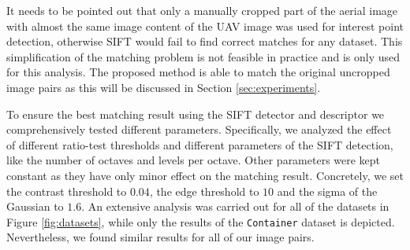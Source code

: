 It needs to be pointed out that only a manually cropped part of the aerial image with almost the same image content of the UAV image was used for interest point detection, otherwise SIFT would fail to find correct matches for any dataset.
This simplification of the matching problem is not feasible in practice and is only used for this analysis.
The proposed method is able to match the original uncropped image pairs as this will be discussed in Section \ref{sec:experiments}.

To ensure the best matching result using the SIFT detector and descriptor we comprehensively tested different parameters. 
Specifically, we analyzed the effect of different ratio-test thresholds and different parameters of the SIFT detection, like the number of octaves and levels per octave. 
Other parameters were kept constant as they have only minor effect on the matching result. 
Concretely, we set the contrast threshold to $0.04$, the edge threshold to $10$ and the sigma of the Gaussian to $1.6$. 
An extensive analysis was carried out for all of the datasets in Figure \ref{fig:datasets}, while only the results of the \texttt{Container} dataset is depicted.
Nevertheless, we found similar results for all of our image pairs. 


